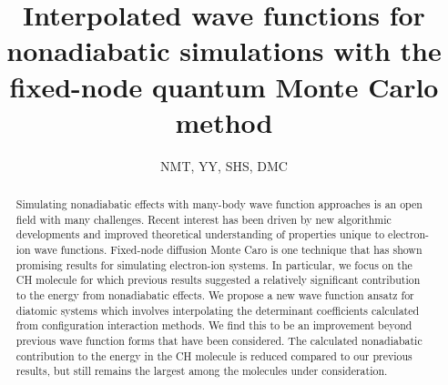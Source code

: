 \documentclass[aip,jcp,numerical,reprint]{revtex4-1}
\begin{document}
\title{Interpolated wave functions for nonadiabatic simulations with the fixed-node quantum Monte Carlo method}
\author{NMT, YY, SHS, DMC}

\begin{abstract}
Simulating nonadiabatic effects with many-body wave function approaches is an open field with many challenges.  %
Recent interest has been driven by new algorithmic developments and improved theoretical understanding of properties unique to electron-ion wave functions.  Fixed-node diffusion Monte Caro is one technique that has shown promising results for simulating electron-ion systems.
In particular, we focus on the CH molecule for which previous results suggested a relatively significant contribution to the energy from nonadiabatic effects.  We propose a new wave function ansatz for diatomic systems which involves interpolating the determinant coefficients calculated from configuration interaction methods.    We find this to be an improvement beyond previous wave function forms that have been considered.    The calculated nonadiabatic contribution to the energy in the CH molecule is reduced compared to our previous results, but still remains the largest among the molecules under consideration.

\end{abstract}
\maketitle
\end{document}
